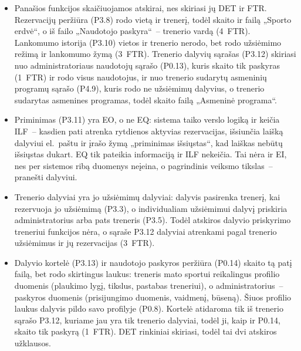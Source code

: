\begin{itemize}
    taikoma ta pati logika. Skiriasi tik tai, kaip parenkamas dalyvis:
    treneris jį pasirenka, o dalyviui rodoma jo paties istorija. Todėl
    skaičiuojama 8~DET ir 3~FTR.
  \item Panašios funkcijos skaičiuojamos atskirai, nes skiriasi jų DET ir
    FTR. Rezervacijų peržiūra (P3.8) rodo vietą ir trenerį, todėl skaito ir
    failą „Sporto erdvė“, o iš failo „Naudotojo paskyra“~– trenerio vardą
    (4~FTR).
    Lankomumo istorija (P3.10) vietos ir trenerio nerodo, bet rodo
    užsiėmimo režimą ir lankomumo žymą (3~FTR). Trenerio dalyvių sąrašas
    (P3.12) skiriasi nuo administratoriaus naudotojų sąrašo (P0.13), kuris
    skaito tik paskyras (1~FTR) ir rodo visus naudotojus, ir nuo trenerio
    sudarytų asmeninių programų sąrašo (P4.9), kuris rodo ne užsiėmimų
    dalyvius, o trenerio sudarytas asmenines programas, todėl skaito failą
    „Asmeninė programa“.
  \item Priminimas (P3.11) yra EO, o ne EQ: sistema taiko verslo logiką ir keičia
    ILF~– kasdien
    pati atrenka rytdienos aktyvias rezervacijas, išsiunčia laišką dalyviui
    el.~paštu ir įrašo žymą „priminimas išsiųstas“, kad laiškas nebūtų
    išsiųstas dukart. EQ tik pateikia informaciją ir ILF
    nekeičia. Tai nėra ir EI, nes per sistemos ribą duomenys neįeina, o
    pagrindinis veiksmo tikslas~– pranešti dalyviui.
  \item Trenerio dalyviai yra jo užsiėmimų dalyviai: dalyvis pasirenka
    trenerį, kai rezervuoja jo užsiėmimą (P3.3), o individualiam užsiėmimui dalyvį priskiria
    administratorius arba pats treneris (P3.5). Todėl atskiros dalyvio priskyrimo treneriui
    funkcijos nėra, o sąraše P3.12 dalyviai atrenkami pagal trenerio užsiėmimus
    ir jų rezervacijas (3~FTR).
  \item Dalyvio kortelė (P3.13) ir naudotojo paskyros peržiūra (P0.14)
    skaito tą patį failą, bet rodo skirtingus laukus: treneris mato sportui
    reikalingus profilio duomenis (plaukimo lygį, tikslus, pastabas
    treneriui), o administratorius~– paskyros duomenis (prisijungimo
    duomenis, vaidmenį, būseną). Šiuos profilio laukus dalyvis pildo
    savo profilyje (P0.8). Kortelė
    atidaroma tik iš trenerio sąrašo P3.12, kuriame jau yra tik trenerio
    dalyviai, todėl ji, kaip ir P0.14, skaito tik paskyrą (1~FTR). DET
    rinkiniai skiriasi, todėl tai dvi atskiros užklausos.
\end{itemize}
